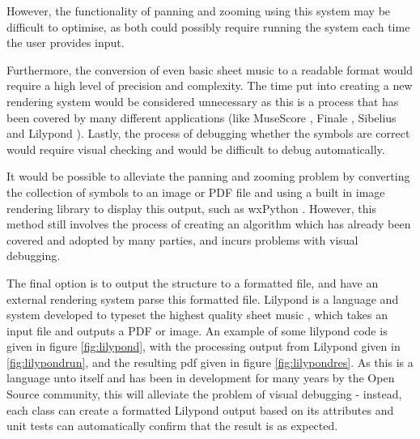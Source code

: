 However, the functionality of panning and zooming using this system may be difficult to optimise, as both could possibly require running the system each time the user provides input. 

Furthermore, the conversion of even basic sheet music to a readable format would require a high level of precision and complexity. The time put into creating a new rendering system would be considered unnecessary as this is a process that has been covered by many different applications (like MuseScore \parencite{MuseTour}, Finale \parencite{mxml}, Sibelius \parencite{avid} and Lilypond \parencite{Lilypond}). 
Lastly, the process of debugging whether the symbols are correct would require visual checking and would be difficult to debug automatically.

It would be possible to alleviate the panning and zooming problem by converting the collection of symbols to an image or PDF file and using a built in image rendering library to display this output, such as wxPython \parencite{WX}. However, this method still involves the process of creating an algorithm which has already been covered and adopted by many parties, and incurs problems with visual debugging.

The final option is to output the structure to a formatted file, and have an external rendering system parse this formatted file. Lilypond is a language and system developed to typeset the highest quality sheet music \parencite{Lilypond}, which takes an input file and outputs a PDF or image. An example of some lilypond code is given in figure \ref{fig:lilypond}, with the processing output from Lilypond given in \ref{fig:lilypondrun}, and the resulting pdf given in figure \ref{fig:lilypondres}. As this is a language unto itself and has been in development for many years by the Open Source community, this will alleviate the problem of visual debugging - instead, each class can create a formatted Lilypond output based on its attributes and unit tests can automatically confirm that the result is as expected.

